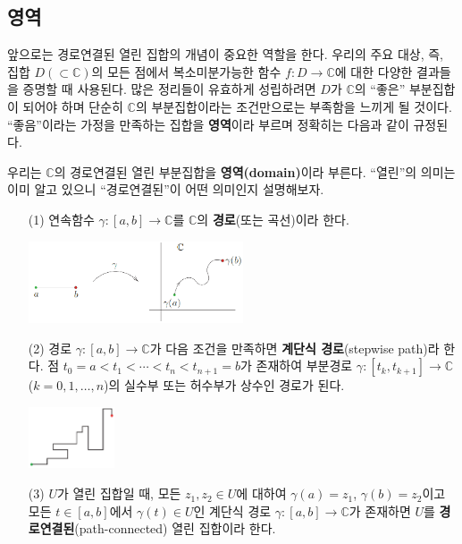 \subsection{영역 \label{sec-1-3-4}}

앞으로는  경로연결된 열린 집합의 개념이 중요한 역할을 한다.
우리의 주요 대상, 즉, 집합 $D(\subset \mathbb C)$의 모든 점에서
복소미분가능한 함수 $f:D\to\mathbb C$에 대한 다양한 결과들을 증명할 때 사용된다.
많은 정리들이 유효하게 성립하려면 $D$가 $\mathbb C$의 ``좋은'' 부분집합이 되어야 하며
단순히 $\mathbb C$의 부분집합이라는 조건만으로는 부족함을 느끼게 될 것이다.
``좋음''이라는 가정을 만족하는 집합을 \textbf{영역}이라 부르며 정확히는 다음과 같이 규정된다.

우리는 $\mathbb C$의 경로연결된 열린 부분집합을 \textbf{영역(domain)}이라 부른다.
``열린''의 의미는 이미 알고 있으니 ``경로연결된''이 어떤 의미인지 설명해보자.

\begin{saltdefinition}{}{} \label{def-1-1}
\begin{itemize}
\item[(1)] 연속함수 $\gamma:[a,b] \to \mathbb C$를 $\mathbb C$의 \textbf{경로}(또는 곡선)이라 한다.
\begin{center}
\includegraphics[width=0.5\textwidth]{./SaltChapter/figs/fig-1-0-2}
\end{center}
\item[(2)] 경로 $\gamma:[a,b] \to \mathbb C$가 다음 조건을 만족하면 
\textbf{계단식 경로}(stepwise path)라 한다.
점 $t_0 = a < t_1 < \cdots < t_n < t_{n+1} = b$가 존재하여
부분경로 $\gamma: [t_k, t_{k+1}] \to \mathbb C$ ($k=0,1,\ldots, n$)의
실수부 또는 허수부가 상수인 경로가 된다.
\begin{center}
\includegraphics[width=0.2\textwidth]{./SaltChapter/figs/fig-1-0-3}
\end{center}
\item[(3)] $U$가 열린 집합일 때,  모든 $z_1, z_2\in U$에 대하여
$\gamma(a)=z_1$, $\gamma(b)=z_2$이고 모든 $t\in[a,b]$에서 $\gamma(t)\in U$인
계단식 경로 $\gamma: [a,b] \to \mathbb C$가 존재하면
$U$를 \textbf{경로연결된}(path-connected) 열린 집합이라 한다.
\end{itemize}
\end{saltdefinition}

